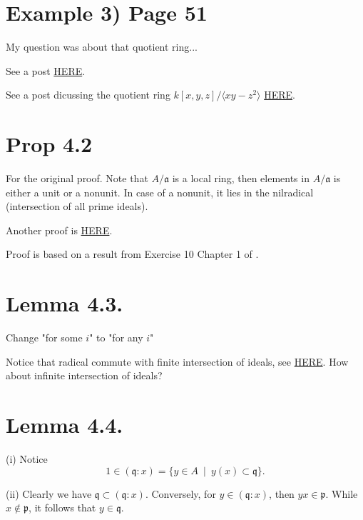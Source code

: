 
\section{Example 3) Page 51}

My question was about that quotient ring... 

See a post \href{https://math.stackexchange.com/questions/93478/is-each-power-of-a-prime-ideal-a-primary-ideal}{HERE}. 

See a post dicussing the quotient ring $k[x,y,z]/\langle xy-z^2\rangle$ \href{https://math.stackexchange.com/questions/3320367/mathbbcx-y-z-xy-z2-is-not-a-field}{HERE}. 

\section{Prop 4.2}

For the original proof. Note that $A/\mathfrak a$ is a local ring, then elements in $A/\mathfrak a$ is either a unit or a nonunit. In case of a nonunit, it lies in the nilradical (intersection of all prime ideals).

Another proof is \href{https://math.stackexchange.com/questions/649146/an-ideal-whose-radical-is-maximal-is-primary}{HERE}.

Proof is based on a result from Exercise 10 Chapter 1 of \cite{atiyah1994introduction}.

\section{Lemma 4.3.}

Change "for some $i$" to "for any $i$" 

Notice that radical commute with finite intersection of ideals, see \href{https://en.wikipedia.org/wiki/Radical_of_an_ideal}{HERE}. 
How about infinite intersection of ideals?

\section{Lemma 4.4.}

(i) Notice \[1\in (\mathfrak q:x)=\{y\in A ~\mid~ y(x)\subset \mathfrak q\}.\]

(ii) Clearly we have $\mathfrak q\subset (\mathfrak q:x)$.
Conversely, for $y\in (\mathfrak q:x)$, then $yx\in \mathfrak p$. While $x\notin \mathfrak p$, it follows that $y\in \mathfrak q$.

